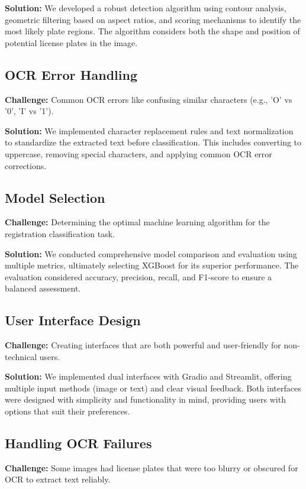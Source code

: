 \documentclass[conference]{IEEEtran}
\begin{document}
\textbf{Solution:} We developed a robust detection algorithm using contour analysis, geometric filtering based on aspect ratios, and scoring mechanisms to identify the most likely plate regions. The algorithm considers both the shape and position of potential license plates in the image.

\subsection{OCR Error Handling}
\textbf{Challenge:} Common OCR errors like confusing similar characters (e.g., 'O' vs '0', 'I' vs '1').

\textbf{Solution:} We implemented character replacement rules and text normalization to standardize the extracted text before classification. This includes converting to uppercase, removing special characters, and applying common OCR error corrections.

\subsection{Model Selection}
\textbf{Challenge:} Determining the optimal machine learning algorithm for the registration classification task.

\textbf{Solution:} We conducted comprehensive model comparison and evaluation using multiple metrics, ultimately selecting XGBoost for its superior performance. The evaluation considered accuracy, precision, recall, and F1-score to ensure a balanced assessment.

\subsection{User Interface Design}
\textbf{Challenge:} Creating interfaces that are both powerful and user-friendly for non-technical users.

\textbf{Solution:} We implemented dual interfaces with Gradio and Streamlit, offering multiple input methods (image or text) and clear visual feedback. Both interfaces were designed with simplicity and functionality in mind, providing users with options that suit their preferences.

\subsection{Handling OCR Failures}
\textbf{Challenge:} Some images had license plates that were too blurry or obscured for OCR to extract text reliably.
\end{document}
